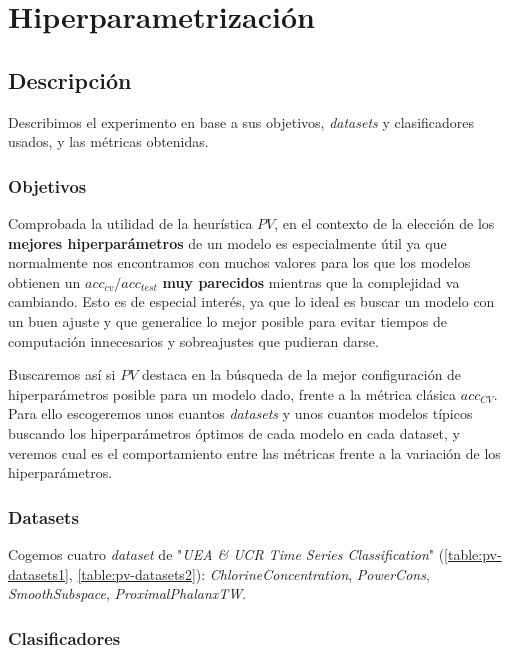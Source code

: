 \section{Hiperparametrización}

\subsection{Descripción}

Describimos el experimento en base a sus objetivos, \emph{datasets} y clasificadores usados, y las métricas obtenidas.

\subsubsection{Objetivos}

Comprobada la utilidad de la heurística $PV$, en el contexto de la elección de los \textbf{mejores hiperparámetros} de un modelo es especialmente útil ya que normalmente nos encontramos con muchos valores para los que los modelos obtienen un $acc_{cv}/acc_{test}$ \textbf{muy parecidos} mientras que la complejidad va cambiando. Esto es de especial interés, ya que lo ideal es buscar un modelo con un buen ajuste y que generalice lo mejor posible para evitar tiempos de computación innecesarios y sobreajustes que pudieran darse.

Buscaremos así  si $PV$ destaca en la búsqueda de la mejor configuración de hiperparámetros posible para un modelo dado, frente a la métrica clásica $acc_{CV}$. Para ello escogeremos unos cuantos \emph{datasets} y unos cuantos modelos típicos buscando los hiperparámetros óptimos de cada modelo en cada dataset, y veremos cual es el comportamiento entre las métricas frente a la variación de los hiperparámetros.

\subsubsection{Datasets}

Cogemos cuatro \emph{dataset} de "\emph{UEA \& UCR Time Series Classification}" \cite{bagnall2020ts} (\autoref{table:pv-datasets1}, \autoref{table:pv-datasets2}): \emph{ChlorineConcentration}, \emph{PowerCons}, \emph{SmoothSubspace}, \emph{ProximalPhalanxTW}.

\subsubsection{Clasificadores}

